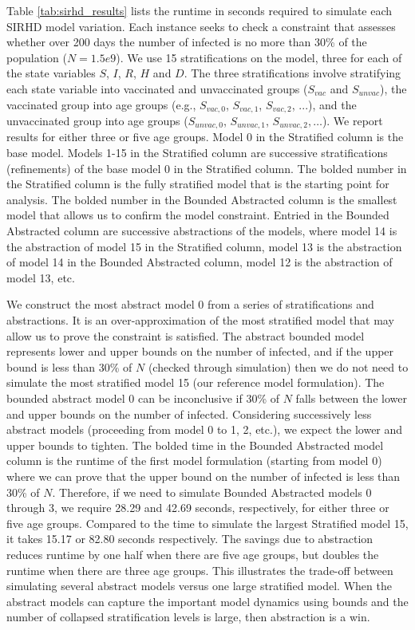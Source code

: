 \begin{table}
\end{table}

Table \ref{tab:sirhd_results} lists the runtime in seconds required to simulate each SIRHD model variation.  Each instance seeks to check a constraint that assesses whether over 200 days the number of infected is no more than 30\% of the population ($N=1.5e9$).  We use 15 stratifications on the model, three for each of the state variables $S$, $I$, $R$, $H$ and $D$.  The three stratifications involve stratifying each state variable into vaccinated and unvaccinated groups ($S_{vac}$ and $S_{unvac}$), the vaccinated group into age groups (e.g., $S_{vac,0}$, $S_{vac,1}$, $S_{vac,2}$, ...), and the unvaccinated group into age groups ($S_{unvac,0}$, $S_{unvac,1}$, $S_{unvac,2}, \ldots$).  We report results for either three or five age groups.  Model 0 in the Stratified column is the base model.  Models 1-15 in the Stratified column are successive stratifications (refinements) of the base model 0 in the Stratified column.  The bolded number in the Stratified column is the fully stratified model that is the starting point for analysis.  The bolded number in the Bounded Abstracted column is the smallest model that allows us to confirm the model constraint.  Entried in the Bounded Abstracted column are successive abstractions of the models, where model 14 is the abstraction of model 15 in the Stratified column,  model 13 is the abstraction of model 14 in the Bounded Abstracted column, model 12 is the abstraction of model 13, etc.

We construct the most abstract model 0 from a series of stratifications and abstractions.  It is an over-approximation of the most stratified model that may allow us to prove the constraint is satisfied.  The abstract bounded model represents lower and upper bounds on the number of infected, and if the upper bound is less than 30\% of $N$ (checked through simulation) then we do not need to simulate the most stratified model 15 (our reference model formulation).  The bounded abstract model 0 can be inconclusive if 30\% of $N$ falls between the lower and upper bounds on the number of infected.  Considering successively less abstract models (proceeding from model 0 to 1, 2, etc.), we expect the lower and upper bounds to tighten.  The bolded time in the Bounded Abstracted model column is the runtime of the first model formulation (starting from model 0) where we can prove that the upper bound on the number of infected is less than 30\% of $N$.  Therefore, if we need to simulate Bounded Abstracted models 0 through 3, we require 28.29  and 42.69 seconds, respectively, for either three or five age groups.  Compared to the time to simulate the largest Stratified model 15, it takes 15.17 or 82.80 seconds respectively.  The savings due to abstraction reduces runtime by one half when there are five age groups, but doubles the runtime when there are three age groups.  This illustrates the trade-off between simulating several abstract models versus one large stratified model.  When the abstract models can capture the important model dynamics using bounds and the number of collapsed stratification levels is large, then abstraction is a win.

